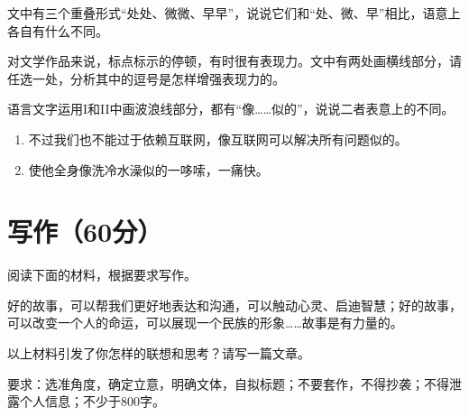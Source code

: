 \documentclass{exam-zh}
\begin{document}
\begin{question}[points=3]
    文中有三个重叠形式“处处、微微、早早”，说说它们和“处、微、早”相比，语意上各自有什么不同。
\end{question}

\begin{question}[points=4]
    对文学作品来说，标点标示的停顿，有时很有表现力。文中有两处画横线部分，请任选一处，分析其中的逗号是怎样增强表现力的。
\end{question}

\begin{question}[points=4]
    语言文字运用I和II中画波浪线部分，都有“像……似的”，说说二者表意上的不同。

    \begin{enumerate}[label=(\arabic*)]
        \item 不过我们也不能过于依赖互联网，像互联网可以解决所有问题似的。
        \item 使他全身像洗冷水澡似的一哆嗦，一痛快。
    \end{enumerate}
\end{question}

\section{写作（60分）}

\begin{question}[points=60]
    阅读下面的材料，根据要求写作。
\end{question}

\begin{material}
好的故事，可以帮我们更好地表达和沟通，可以触动心灵、启迪智慧；好的故事，可以改变一个人的命运，可以展现一个民族的形象……故事是有力量的。
\end{material}

以上材料引发了你怎样的联想和思考？请写一篇文章。\par
要求：选准角度，确定立意，明确文体，自拟标题；不要套作，不得抄袭；不得泄露个人信息；不少于800字。
\end{document}
